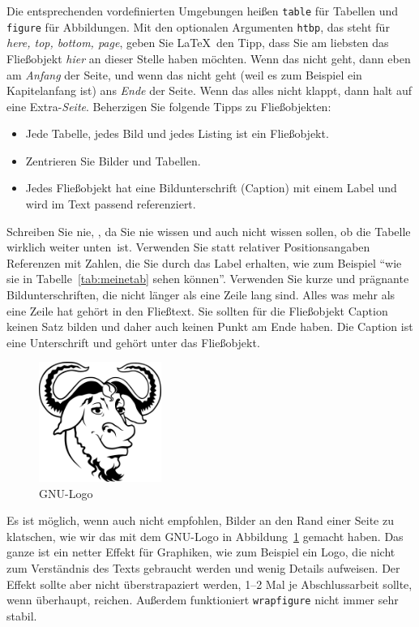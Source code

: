 \documentclass[11pt,a4paper]{report}
\begin{document}
Die entsprechenden vordefinierten Umgebungen heißen 
\verb|table| für Tabellen und \verb|figure| für Abbildungen. 
Mit den optionalen Argumenten \verb|htbp|, das steht für
\textit{here, top, bottom, page}, geben Sie \LaTeX\ den 
Tipp, dass Sie am liebsten das Fließobjekt \textit{hier}
an dieser Stelle haben möchten. Wenn das nicht geht, dann
eben am \textit{Anfang} der Seite, und wenn das nicht geht (weil es
zum Beispiel ein Kapitelanfang ist) ans \textit{Ende} der Seite. 
Wenn das alles nicht klappt, dann halt auf eine Extra-\textit{Seite}.
Beherzigen Sie folgende Tipps zu Fließobjekten:
\begin{itemize}
\item Jede Tabelle, jedes Bild und jedes Listing ist ein Fließobjekt.
\item Zentrieren Sie Bilder und Tabellen.
\item Jedes Fließobjekt hat eine Bildunterschrift (Caption) mit
  einem Label und wird im Text passend referenziert.
\end{itemize}
Schreiben Sie nie, ,
da Sie nie wissen und auch nicht wissen sollen, ob die Tabelle 
wirklich \glqq weiter unten\grqq\ ist. 
Verwenden Sie statt relativer Positionsangaben Referenzen mit Zahlen,
die Sie durch das Label erhalten, wie zum Beispiel 
"`wie sie in Tabelle~\ref{tab:meinetab} sehen können"'.
Verwenden Sie kurze und prägnante Bildunterschriften, die 
nicht länger als eine Zeile lang sind. 
Alles was mehr als eine Zeile hat gehört in den Fließtext.
Sie sollten für die Fließobjekt Caption keinen Satz bilden und 
daher auch keinen Punkt am Ende haben.
Die Caption ist eine Unterschrift und gehört unter das Fließobjekt.

\begin{figure}
  \centering
  \includegraphics[width=4cm]{gnu}
  \caption{GNU-Logo~\cite{gnulogo,fal}}
  \label{fig:gnu}
\end{figure}
Es ist möglich, wenn auch nicht empfohlen, 
Bilder an den 
Rand einer Seite zu klatschen, wie wir das mit dem 
GNU-Logo in Abbildung~\ref{fig:gnu} gemacht haben. 
Das ganze ist ein netter Effekt für Graphiken, wie zum Beispiel ein
Logo, die nicht zum Verständnis des Texts gebraucht werden und wenig
Details aufweisen. 
Der Effekt sollte aber nicht überstrapaziert werden, 1--2 Mal 
je Abschlussarbeit sollte, wenn überhaupt, rei\-chen.
Außerdem funktioniert \verb|wrapfigure| nicht immer sehr stabil.
\end{document}
